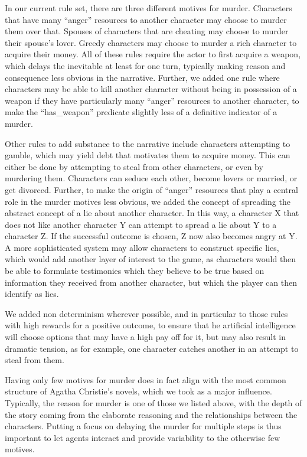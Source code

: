 In our current rule set, there are three different motives for murder.
Characters that have many \enquote{anger} resources to another character may choose to murder them over that.
Spouses of characters that are cheating may choose to murder their spouse's lover.
Greedy characters may choose to murder a rich character to acquire their money.
All of these rules require the actor to first acquire a weapon, which delays the inevitable at least for one turn, typically making reason and consequence less obvious in the narrative.
Further, we added one rule where characters may be able to kill another character without being in possession of a weapon if they have particularly many \enquote{anger} resources to another character, to make the \enquote{has\_weapon} predicate slightly less of a definitive indicator of a murder.

Other rules to add substance to the narrative include characters attempting to gamble, which may yield debt that motivates them to acquire money.
This can either be done by attempting to steal from other characters, or even by murdering them.
Characters can seduce each other, become lovers or married, or get divorced.
Further, to make the origin of \enquote{anger} resources that play a central role in the murder motives less obvious, we added the concept of spreading the abstract concept of a lie about another character.
In this way, a character X that does not like another character Y can attempt to spread a lie about Y to a character Z.
If the successful outcome is chosen, Z now also becomes angry at Y.
A more sophisticated system may allow characters to construct specific lies, which would add another layer of interest to the game, as characters would then be able to formulate testimonies which they believe to be true based on information they received from another character, but which the player can then identify as lies.

We added non determinism wherever possible, and in particular to those rules with high rewards for a positive outcome, to ensure that he artificial intelligence will choose options that may have a high pay off for it, but may also result in dramatic tension, as for example, one character catches another in an attempt to steal from them.

Having only few motives for murder does in fact align with the most common structure of Agatha Christie's novels, which we took as a major influence.
Typically, the reason for murder is one of those we listed above, with the depth of the story coming from the elaborate reasoning and the relationships between the characters.
Putting a focus on delaying the murder for multiple steps is thus important to let agents interact and provide variability to the otherwise few motives.


